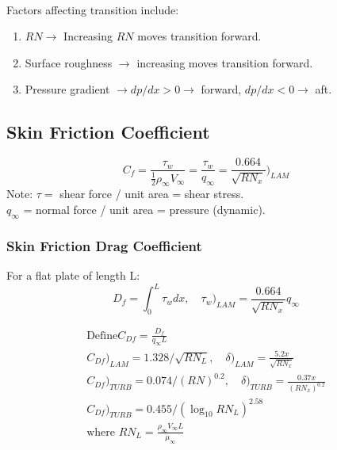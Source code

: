\documentclass[draft=false, titlepage]{article}
\begin{document}
\paragraph*{} Factors affecting transition include:
\begin{enumerate}
	\item $RN \rightarrow $ Increasing $RN$ moves transition forward.
	\item Surface roughness $\rightarrow$ increasing moves transition forward.
	\item Pressure gradient $\rightarrow dp/dx > 0 \rightarrow $ forward, $dp/dx < 0 \rightarrow$ aft.
\end{enumerate}

\subsection{Skin Friction Coefficient}
\begin{equation}
C_f = \frac{\tau_w}{\frac{1}{2}\rho_\infty V_\infty} = \frac{\tau_w}{q_\infty} = \frac{0.664}{\sqrt{RN_x}}\Big)_{LAM}
\label{eq:skinFriction}
\end{equation}
Note: $\tau =$ shear force / unit area = shear stress.\\
$q_\infty$ = normal force / unit area = pressure (dynamic).
\subsubsection{Skin Friction Drag Coefficient}
For a flat plate of length L:
\begin{equation}
D_f  = \int_0^L \tau_w dx,\quad \tau_w\Big)_{LAM} = \frac{0.664}{\sqrt{RN_x}}q_\infty
\label{eq:skinFrictionDrag}
\end{equation}

\begin{gather*}
\text{Define} C_{Df} = \frac{D_f}{q_\infty L}\\C_{Df}\Big)_{LAM} = 1.328/\sqrt{RN_L},\quad \delta\Big)_{LAM} = \frac{5.2x}{\sqrt{RN_x}}\\
C_{Df}\Big)_{TURB} = 0.074/(RN)^{0.2},\quad \delta\Big)_{TURB} = \frac{0.37x}{(RN_x)^{0.2}}\\
C_{Df}\Big)_{TURB} = 0.455/(\log_{10}RN_L)^{2.58}\\
\text{where } RN_L = \frac{\rho_\infty V_\infty L}{\mu_\infty}
\end{gather*}
\end{document}
